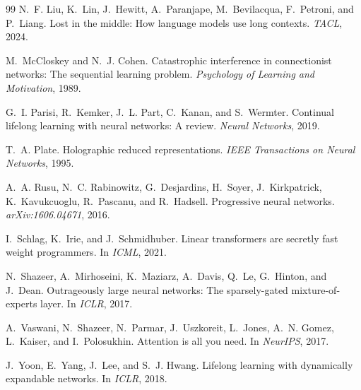 \documentclass[11pt,a4paper]{article}
\begin{document}
\begin{thebibliography}{99}
N.~F. Liu, K.~Lin, J.~Hewitt, A.~Paranjape, M.~Bevilacqua, F.~Petroni, and
  P.~Liang.
\newblock Lost in the middle: How language models use long contexts.
\newblock \emph{TACL}, 2024.

M.~McCloskey and N.~J. Cohen.
\newblock Catastrophic interference in connectionist networks: The sequential
  learning problem.
\newblock \emph{Psychology of Learning and Motivation}, 1989.

G.~I. Parisi, R.~Kemker, J.~L. Part, C.~Kanan, and S.~Wermter.
\newblock Continual lifelong learning with neural networks: A review.
\newblock \emph{Neural Networks}, 2019.

T.~A. Plate.
\newblock Holographic reduced representations.
\newblock \emph{IEEE Transactions on Neural Networks}, 1995.

A.~A. Rusu, N.~C. Rabinowitz, G.~Desjardins, H.~Soyer, J.~Kirkpatrick,
  K.~Kavukcuoglu, R.~Pascanu, and R.~Hadsell.
\newblock Progressive neural networks.
\newblock \emph{arXiv:1606.04671}, 2016.

I.~Schlag, K.~Irie, and J.~Schmidhuber.
\newblock Linear transformers are secretly fast weight programmers.
\newblock In \emph{ICML}, 2021.

N.~Shazeer, A.~Mirhoseini, K.~Maziarz, A.~Davis, Q.~Le, G.~Hinton, and J.~Dean.
\newblock Outrageously large neural networks: The sparsely-gated
  mixture-of-experts layer.
\newblock In \emph{ICLR}, 2017.

A.~Vaswani, N.~Shazeer, N.~Parmar, J.~Uszkoreit, L.~Jones, A.~N. Gomez,
  L.~Kaiser, and I.~Polosukhin.
\newblock Attention is all you need.
\newblock In \emph{NeurIPS}, 2017.

J.~Yoon, E.~Yang, J.~Lee, and S.~J. Hwang.
\newblock Lifelong learning with dynamically expandable networks.
\newblock In \emph{ICLR}, 2018.

\end{thebibliography}
\end{document}
